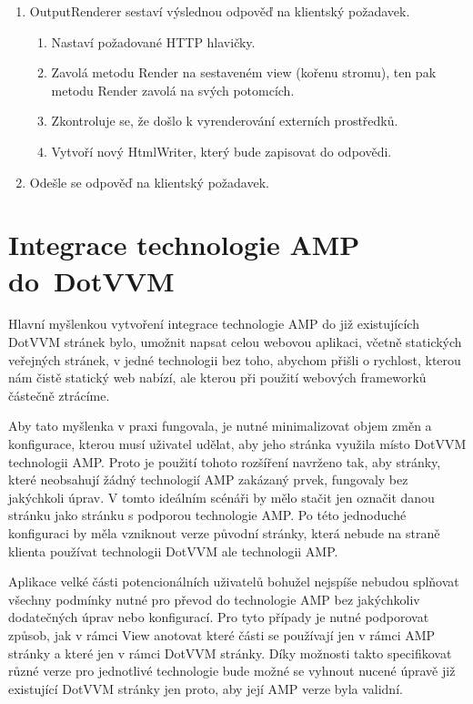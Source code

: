 \begin{enumerate}
    \item OutputRenderer sestaví výslednou odpověď na klientský požadavek.
    \begin{enumerate}
        \item Nastaví požadované HTTP hlavičky.
        \item Zavolá metodu Render na sestaveném view (kořenu stromu), ten pak metodu Render zavolá na svých potomcích.
        \item Zkontroluje se, že došlo k vyrenderování externích prostředků.
        \item Vytvoří nový HtmlWriter, který bude zapisovat do odpovědi.
    \end{enumerate}
    \item Odešle se odpověď na klientský požadavek.
\end{enumerate}

\chapter{Integrace technologie AMP do~DotVVM}
Hlavní myšlenkou vytvoření integrace technologie AMP do již existujících DotVVM stránek bylo,  umožnit napsat celou webovou aplikaci, včetně statických veřejných stránek, v jedné technologii bez toho, abychom přišli o rychlost, kterou nám čistě statický web nabízí, ale kterou při použití webových frameworků částečně ztrácíme.

Aby tato myšlenka v praxi fungovala, je nutné minimalizovat objem změn a konfigurace, kterou musí uživatel udělat, aby jeho stránka využila místo DotVVM technologii AMP. Proto je použití tohoto rozšíření navrženo tak, aby stránky, které neobsahují žádný technologií AMP zakázaný prvek, fungovaly bez jakýchkoli úprav. V tomto ideálním scénáři by mělo stačit jen označit danou stránku jako stránku s podporou technologie AMP. Po této jednoduché konfiguraci by měla vzniknout verze původní stránky, která nebude na straně klienta používat technologii DotVVM ale technologii AMP.

Aplikace velké části potencionálních uživatelů bohužel nejspíše nebudou splňovat všechny podmínky nutné pro převod do technologie AMP bez jakýchkoliv dodatečných úprav nebo konfigurací. Pro tyto případy je nutné podporovat způsob, jak v rámci View anotovat které části se používají jen v rámci AMP stránky a které jen v rámci DotVVM stránky. Díky možnosti takto specifikovat různé verze pro jednotlivé technologie bude možné se vyhnout nucené úpravě již existující DotVVM stránky jen proto, aby její AMP verze byla validní.

